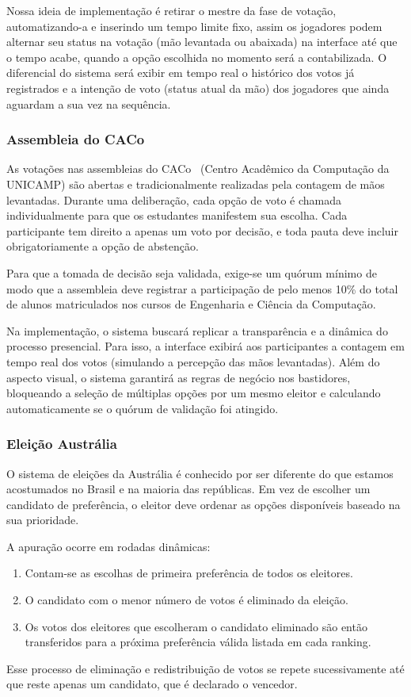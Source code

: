 \documentclass[12pt,a4paper]{article}
\begin{document}
Nossa ideia de implementação é retirar o mestre da fase de votação, automatizando-a e inserindo um tempo limite fixo, assim os jogadores podem alternar seu status na votação (mão levantada ou abaixada) na interface até que o tempo acabe, quando a opção escolhida no momento será a contabilizada. O diferencial do sistema será exibir em tempo real o histórico dos votos já registrados e a intenção de voto (status atual da mão) dos jogadores que ainda aguardam a sua vez na sequência.

\subsubsection{Assembleia do CACo}

As votações nas assembleias do CACo~\cite{caco2026} (Centro Acadêmico da Computação da UNICAMP) são abertas e tradicionalmente realizadas pela contagem de mãos levantadas. Durante uma deliberação, cada opção de voto é chamada individualmente para que os estudantes manifestem sua escolha. Cada participante tem direito a apenas um voto por decisão, e toda pauta deve incluir obrigatoriamente a opção de abstenção. 

Para que a tomada de decisão seja validada, exige-se um quórum mínimo de modo que a assembleia deve registrar a participação de pelo menos 10\% do total de alunos matriculados nos cursos de Engenharia e Ciência da Computação.

Na implementação, o sistema buscará replicar a transparência e a dinâmica do processo presencial. Para isso, a interface exibirá aos participantes a contagem em tempo real dos votos (simulando a percepção das mãos levantadas). Além do aspecto visual, o sistema garantirá as regras de negócio nos bastidores, bloqueando a seleção de múltiplas opções por um mesmo eleitor e calculando automaticamente se o quórum de validação foi atingido.

\subsubsection{Eleição Austrália}
O sistema de eleições da Austrália é conhecido por ser diferente do que estamos acostumados no Brasil e na maioria das repúblicas. Em vez de escolher um candidato de preferência, o eleitor deve ordenar as opções disponíveis baseado na sua prioridade.

A apuração ocorre em rodadas dinâmicas:

\begin{enumerate}

    \item Contam-se as escolhas de primeira preferência de todos os eleitores. 
    
    \item O candidato com o menor número de votos é eliminado da eleição. 
    
    \item Os votos dos eleitores que escolheram o candidato eliminado são então transferidos para a próxima preferência válida listada em cada ranking. 
\end{enumerate}
Esse processo de eliminação e redistribuição de votos se repete sucessivamente até que reste apenas um candidato, que é declarado o vencedor.
\end{document}

